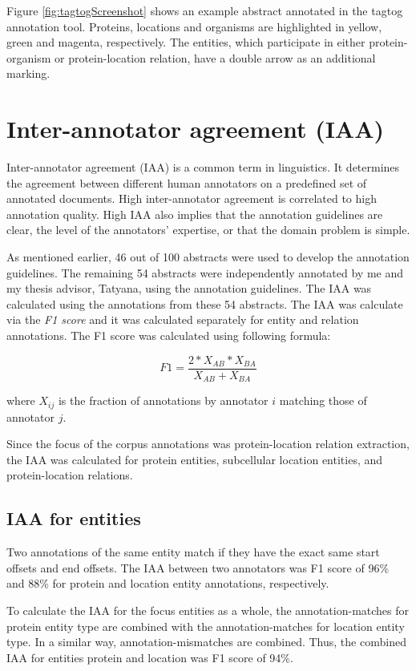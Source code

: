 Figure \ref{fig:tagtogScreenshot} shows an example abstract annotated in the tagtog annotation tool. Proteins, locations and organisms are highlighted in yellow, green and magenta, respectively. The entities, which participate in either protein-organism or protein-location relation, have a double arrow as an additional marking.

\section{Inter-annotator agreement (IAA)}

Inter-annotator agreement (IAA) is a common term in linguistics. It determines the agreement between different human annotators on a predefined set of annotated documents. High inter-annotator agreement is correlated to high annotation quality. High IAA also implies that the annotation guidelines are clear, the level of the annotators' expertise, or that the domain problem is simple.

As mentioned earlier, 46 out of 100 abstracts were used to develop the annotation guidelines. The remaining 54 abstracts were independently annotated by me and my thesis advisor, Tatyana, using the annotation guidelines. The IAA was calculated using the annotations from these 54 abstracts. The IAA was calculate via the \textit{F1 score} and it was calculated separately for entity and relation annotations. The F1 score was calculated using following formula:

$$
F1 = \frac{2*X_{AB}*X_{BA}}{X_{AB}+X_{BA}}
$$

where $X_{ij}$ is the fraction of annotations by annotator $i$ matching those of annotator $j$.

Since the focus of the corpus annotations was protein-location relation extraction, the IAA was calculated for protein entities, subcellular location entities, and protein-location relations.

\subsection*{IAA for entities}

Two annotations of the same entity match if they have the exact same start offsets and end offsets. The IAA between two annotators was F1 score of 96\% and 88\% for protein and location entity annotations, respectively. 

To calculate the IAA for the focus entities as a whole, the annotation-matches for protein entity type are combined with the annotation-matches for location entity type. In a similar way, annotation-mismatches are combined. Thus, the combined IAA for entities protein and location was F1 score of 94\%.

